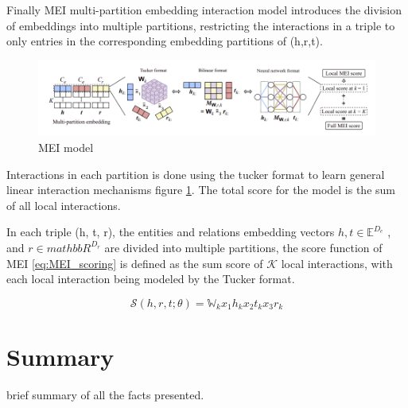 Finally MEI \cite{} multi-partition embedding interaction model introduces the division of embeddings into multiple partitions, restricting the interactions in a triple to only entries in the corresponding embedding partitions of (h,r,t).

\begin{figure}[!ht]
    \centering
    \includegraphics[width=\textwidth]{fig/embeddings/MEI.png}
    \caption{MEI model}
    \label{fig:emb-MEI}
\end{figure}

Interactions in each partition is done using the tucker format\cite{} to learn general linear interaction mechanisms figure \ref{fig:emb-MEI}. The total score for the model is the sum of all local interactions. 

In each triple (h, t, r), the entities and relations embedding vectors $h, t \in \mathbb{E}^{D_e}$ , and $r \in mathbb{R}^{D_r}$ are divided into multiple partitions, the score function of MEI \ref{eq:MEI_scoring} is defined as the sum score of $\mathcal{K}$ local interactions, with each local interaction being modeled by the Tucker format.

\begin{equation}
    \label{eq:MEI_scoring}
    \mathcal{S}(h, r, t; \theta) = \mathbb{W}_k x_1 h_k x_2 t_k x_3 r_k
\end{equation}

\section{Summary}\label{sec:emb-summary}

brief summary of all the facts presented.